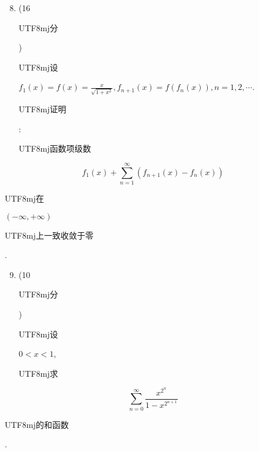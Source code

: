 \documentclass[10pt]{article}
\begin{document}
\begin{enumerate}
  \setcounter{enumi}{7}
  \item (16 \begin{CJK}{UTF8}{mj}分\end{CJK}) \begin{CJK}{UTF8}{mj}设\end{CJK} $f_{1}(x)=f(x)=\frac{x}{\sqrt{1+x^{2}}}, f_{n+1}(x)=f\left(f_{n}(x)\right), n=1,2, \cdots$. \begin{CJK}{UTF8}{mj}证明\end{CJK}: \begin{CJK}{UTF8}{mj}函数项级数\end{CJK}
\end{enumerate}
$$
f_{1}(x)+\sum_{n=1}^{\infty}\left(f_{n+1}(x)-f_{n}(x)\right)
$$
\begin{CJK}{UTF8}{mj}在\end{CJK} $(-\infty,+\infty)$ \begin{CJK}{UTF8}{mj}上一致收敛于零\end{CJK}.

\begin{enumerate}
  \setcounter{enumi}{8}
  \item (10 \begin{CJK}{UTF8}{mj}分\end{CJK}) \begin{CJK}{UTF8}{mj}设\end{CJK} $0<x<1$, \begin{CJK}{UTF8}{mj}求\end{CJK}
\end{enumerate}
$$
\sum_{n=0}^{\infty} \frac{x^{2^{n}}}{1-x^{2^{n+1}}}
$$
\begin{CJK}{UTF8}{mj}的和函数\end{CJK}.
\end{document}
